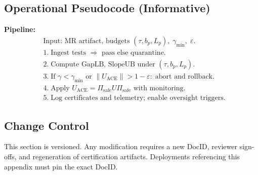 \documentclass[10pt]{article}
\begin{document}
\subsection*{Operational Pseudocode (Informative)}
\noindent\textbf{Pipeline:}
\begin{align*}
&\text{Input: MR artifact, budgets } (\tau, b_p, L_p),\; \gamma_{\min},\; \varepsilon.\\
&1.\; \text{Ingest tests }\Rightarrow \text{ pass else quarantine}.\\
&2.\; \text{Compute GapLB, SlopeUB under } (\tau, b_p, L_p).\\
&3.\; \text{If } \gamma\!<\!\gamma_{\min} \text{ or } \|U_{\mathrm{ACE}}\|\!>\!1-\varepsilon:\; \text{abort and rollback}.\\
&4.\; \text{Apply } U_{\mathrm{ACE}} = \Pi_{\mathrm{safe}} U \Pi_{\mathrm{safe}} \text{ with monitoring}.\\
&5.\; \text{Log certificates and telemetry; enable oversight triggers}.
\end{align*}


\subsection*{Change Control}
This section is versioned. Any modification requires a new DocID, reviewer sign-offs, and regeneration of certification artifacts. Deployments referencing this appendix must pin the exact DocID.
\nocite{*}


\end{document}

